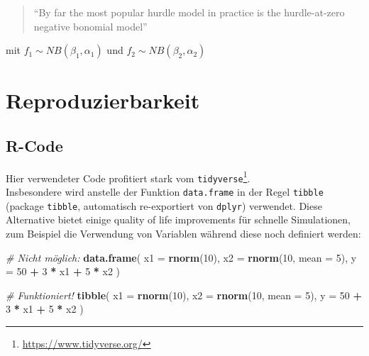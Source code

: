\documentclass[ngerman,a4paper,]{scrartcl}
\newenvironment{Shaded}{\begin{snugshade}}{\end{snugshade}}
\newcommand{\CommentTok}[1]{\textcolor[rgb]{0.56,0.35,0.01}{\textit{#1}}}
\newcommand{\DataTypeTok}[1]{\textcolor[rgb]{0.13,0.29,0.53}{#1}}
\newcommand{\DecValTok}[1]{\textcolor[rgb]{0.00,0.00,0.81}{#1}}
\newcommand{\KeywordTok}[1]{\textcolor[rgb]{0.13,0.29,0.53}{\textbf{#1}}}
\newcommand{\NormalTok}[1]{#1}
\newcommand{\OperatorTok}[1]{\textcolor[rgb]{0.81,0.36,0.00}{\textbf{#1}}}
\newcommand{\StringTok}[1]{\textcolor[rgb]{0.31,0.60,0.02}{#1}}
\renewcommand{\href}[2]{#2\footnote{\url{#1}}}
\let\rmarkdownfootnote\footnote%
\def\footnote{\protect\rmarkdownfootnote}
\theoremstyle{definition}
\theoremstyle{definition}
\theoremstyle{definition}
\theoremstyle{remark}
\begin{document}
\begin{quote}
\enquote{By far the most popular hurdle model in practice is the hurdle-at-zero negative bonomial model}
\citep[p.~183]{winkelmannEconometricAnalysisCount2010}
\end{quote}

mit \(f_1 \sim NB(\beta_1, \alpha_1)\) und \(f_2 \sim NB(\beta_2, \alpha_2)\)

\hypertarget{repro}{%
\section{Reproduzierbarkeit}\label{repro}}

\hypertarget{r-code}{%
\subsection{R-Code}\label{r-code}}

Hier verwendeter Code profitiert stark vom \href{https://www.tidyverse.org/}{\texttt{tidyverse}}.\\
Insbesondere wird anstelle der Funktion \texttt{data.frame} in der Regel \texttt{tibble} (package \texttt{tibble}, automatisch re-exportiert von \texttt{dplyr}) verwendet. Diese Alternative bietet einige quality of life improvements für schnelle Simulationen, zum Beispiel die Verwendung von Variablen während diese noch definiert werden:

\begin{Shaded}
\begin{Highlighting}[]
\CommentTok{# Nicht möglich:}
\KeywordTok{data.frame}\NormalTok{(}
   \DataTypeTok{x1 =} \KeywordTok{rnorm}\NormalTok{(}\DecValTok{10}\NormalTok{),}
   \DataTypeTok{x2 =} \KeywordTok{rnorm}\NormalTok{(}\DecValTok{10}\NormalTok{, }\DataTypeTok{mean =} \DecValTok{5}\NormalTok{),}
   \DataTypeTok{y =} \DecValTok{50} \OperatorTok{+}\StringTok{ }\DecValTok{3} \OperatorTok{*}\StringTok{ }\NormalTok{x1 }\OperatorTok{+}\StringTok{ }\DecValTok{5} \OperatorTok{*}\StringTok{ }\NormalTok{x2}
\NormalTok{)}

\CommentTok{# Funktioniert!}
\KeywordTok{tibble}\NormalTok{(}
   \DataTypeTok{x1 =} \KeywordTok{rnorm}\NormalTok{(}\DecValTok{10}\NormalTok{),}
   \DataTypeTok{x2 =} \KeywordTok{rnorm}\NormalTok{(}\DecValTok{10}\NormalTok{, }\DataTypeTok{mean =} \DecValTok{5}\NormalTok{),}
   \DataTypeTok{y =} \DecValTok{50} \OperatorTok{+}\StringTok{ }\DecValTok{3} \OperatorTok{*}\StringTok{ }\NormalTok{x1 }\OperatorTok{+}\StringTok{ }\DecValTok{5} \OperatorTok{*}\StringTok{ }\NormalTok{x2}
\NormalTok{)}
\end{Highlighting}
\end{Shaded}
\end{document}
